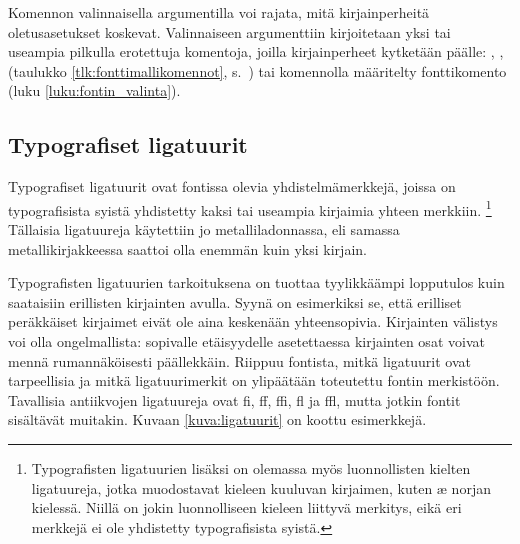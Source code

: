 \begin{koodilohkosis}
\end{koodilohkosis}

Komennon valinnaisella argumentilla voi rajata, mitä kirjainperheitä
oletusasetukset koskevat. Valinnaiseen argumenttiin kirjoitetaan yksi
tai useampia pilkulla erotettuja komentoja, joilla kirjainperheet
kytketään päälle: , ,
 (taulukko \ref{tlk:fonttimallikomennot},
s.~\pageref{tlk:fonttimallikomennot}) tai komennolla
 määritelty fonttikomento (luku
\ref{luku:fontin_valinta}).

\subsection{Typografiset ligatuurit}
\label{luku:typo_liga}

Typografiset ligatuurit ovat fontissa olevia yhdistelmämerkkejä, joissa
on typografisista syistä yhdistetty kaksi tai useampia kirjaimia yhteen
merkkiin.%
\footnote{Typografisten ligatuurien lisäksi on olemassa myös
  luonnollisten kielten ligatuureja, jotka muodostavat kieleen kuuluvan
  kirjaimen, kuten æ norjan kielessä. Niillä on jokin luonnolliseen
  kieleen liittyvä merkitys, eikä eri merkkejä ei ole yhdistetty
  typografisista syistä.} Tällaisia ligatuureja käytettiin jo
metalliladonnassa, eli samassa metallikirjakkeessa saattoi olla enemmän
kuin yksi kirjain.

Typografisten ligatuurien tarkoituksena on tuottaa tyylikkäämpi
lopputulos kuin saataisiin erillisten kirjainten avulla. Syynä on
esimerkiksi se, että erilliset peräkkäiset kirjaimet eivät ole aina
keskenään yhteensopivia. Kirjainten välistys voi olla ongelmallista:
sopivalle etäisyydelle asetettaessa kirjainten osat voivat mennä
rumannäköisesti päällekkäin. Riippuu fontista, mitkä ligatuurit ovat
tarpeellisia ja mitkä ligatuurimerkit on ylipäätään toteutettu fontin
merkistöön. Tavallisia antiikvojen ligatuureja ovat fi, ff, ffi, fl ja
ffl, mutta jotkin fontit sisältävät muitakin. Kuvaan
\ref{kuva:ligatuurit} on koottu esimerkkejä.


